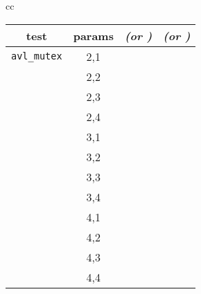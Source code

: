 \begin{table}[t]
\begin{center}
\begin{tabular}{cc}
\begin{tabular}{cc||r|r}
			\bf test & \bf params & \em (or \ETAdag{\bf \em ETA}) & \em (or \ETAdag{\bf \em est.}) \\
			\hline
			\hline
			{\tt avl\_mutex}
			& 2,1 & \cpu{2.49} & \ints{3} \\
			& 2,2 & \cpu{2.44} & \ints{3} \\
			& 2,3 & \cpu{2.45} & \ints{3} \\
			& 2,4 & \cpu{2.41} & \ints{3} \\
			& 3,1 & \cpu{2.69} & \ints{12} \\
			& 3,2 & \cpu{2.67} & \ints{12} \\
			& 3,3 & \cpu{2.76} & \ints{13} \\
			& 3,4 & \cpu{2.74} & \ints{13} \\
			& 4,1 & \cpu{4.03} & \ints{60} \\
			& 4,2 & \cpu{4.34} & \ints{66} \\
			& 4,3 & \cpu{4.53} & \ints{71} \\
			& 4,4 & \cpu{4.75} & \ints{73} \\

\end{tabular}
\end{tabular}
\end{center}
\end{table}
